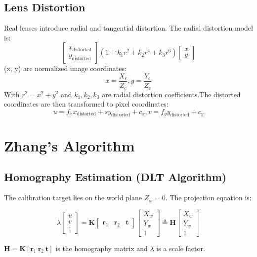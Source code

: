 \documentclass{article}
\begin{document}
\subsection{Lens Distortion}
Real lenses introduce radial and tangential distortion. The radial distortion model is:
\[
\begin{bmatrix}
x_{\text{distorted}} \\
y_{\text{distorted}}
\end{bmatrix}
\left(1 + k_1 r^2 + k_2 r^4 + k_3 r^6\right)
\begin{bmatrix}
x \\
y
\end{bmatrix}
\]
(x, y) are normalized image coordinates: 
\[
x = \frac{X_c}{Z_c}, y = \frac{Y_c}{Z_c}
\]
With $r^2 = x^2 + y^2$ and $k_1, k_2, k_3$ are radial distortion coefficients.The distorted coordinates are then transformed to pixel coordinates:
\[
u = f_x x_{\text{distorted}} + s y_{\text{distorted}} + c_x,  v = f_y y_{\text{distorted}} + c_y
\]

\section{Zhang's Algorithm}
\subsection{Homography Estimation (DLT Algorithm)}
The calibration target lies on the world plane $Z_w = 0$. The projection equation is:

\[
\lambda
\begin{bmatrix}
u \\
v \\
1
\end{bmatrix}
=
\mathbf{K}
\begin{bmatrix}
\mathbf{r}_1 & \mathbf{r}_2 & \mathbf{t}
\end{bmatrix}
\begin{bmatrix}
X_w \\
Y_w \\
1
\end{bmatrix}
\triangleq
\mathbf{H}
\begin{bmatrix}
X_w \\
Y_w \\
1
\end{bmatrix}
\]

$\mathbf{H} = \mathbf{K} [\mathbf{r}_1 \ \mathbf{r}_2 \ \mathbf{t}]$ is the homography matrix and $\lambda$ is a scale factor.
\end{document}
